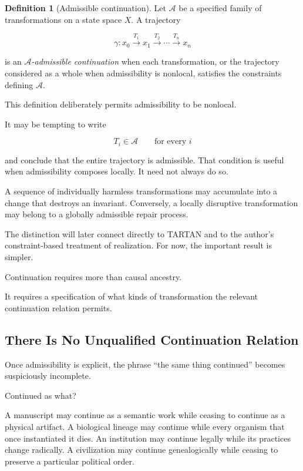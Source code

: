 \documentclass[
  11pt,
  a4paper,
  DIV=12,
  BCOR=0mm,
  parskip=half-
]{scrartcl}
\newcommand{\Adm}{\mathcal A}
\theoremstyle{definition}
\newtheorem{definition}{Definition}[section]
\theoremstyle{plain}
\theoremstyle{remark}
\begin{document}
\begin{definition}[Admissible continuation]
\label{def:admissible-continuation}
Let \(\Adm\) be a specified family of transformations on a state space \(X\).
A trajectory

\[
  \gamma:
  x_0
  \xrightarrow{T_1}
  x_1
  \xrightarrow{T_2}
  \cdots
  \xrightarrow{T_n}
  x_n
\]

is an \emph{\(\Adm\)-admissible continuation} when each transformation, or the
trajectory considered as a whole when admissibility is nonlocal, satisfies
the constraints defining \(\Adm\).
\end{definition}

This definition deliberately permits admissibility to be nonlocal.

It may be tempting to write

\[
  T_i\in\Adm
  \qquad
  \text{for every }i
\]

and conclude that the entire trajectory is admissible. That condition is
useful when admissibility composes locally. It need not always do so.

A sequence of individually harmless transformations may accumulate into a
change that destroys an invariant. Conversely, a locally disruptive
transformation may belong to a globally admissible repair process.

The distinction will later connect directly to TARTAN and to the author's
constraint-based treatment of realization. For now, the important result is
simpler.

Continuation requires more than causal ancestry.

It requires a specification of what kinds of transformation the relevant
continuation relation permits.


\subsection{There Is No Unqualified Continuation Relation}
\label{sec:typed-continuation}

Once admissibility is explicit, the phrase \enquote{the same thing continued}
becomes suspiciously incomplete.

Continued as what?

A manuscript may continue as a semantic work while ceasing to continue as a
physical artifact. A biological lineage may continue while every organism
that once instantiated it dies. An institution may continue legally while its
practices change radically. A civilization may continue genealogically while
ceasing to preserve a particular political order.
\end{document}
